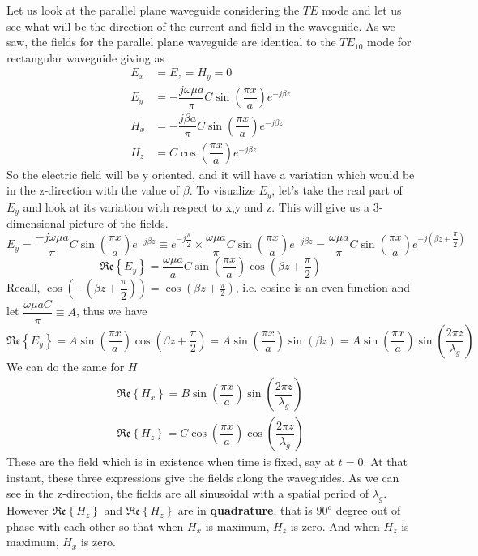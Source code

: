 Let us look at the parallel plane waveguide considering the $TE$ mode and let us see what will be the direction of the current and field in the waveguide. As we saw, the fields for the parallel plane waveguide are identical to the $TE_{10}$ mode for rectangular waveguide giving as
\begin{align*}
E_x &= E_z = H_y = 0\\
E_y &= -\dfrac{j\omega \mu a}{\pi}C\sin(\dfrac{\pi x}{a})e^{-j\beta z}\\
H_x &= -\dfrac{j\beta a}{\pi}C\sin(\dfrac{\pi x}{a})e^{-j\beta z}\\
H_z &= C\cos(\dfrac{\pi x}{a})e^{-j\beta z}
\end{align*}
So the electric field will be y oriented, and it will have a variation which would be in the z-direction with the value of ${\beta}$. To visualize ${E_y}$, let's take the real part of ${E_y}$ and look at its variation with respect to x,y and z. This will give us a 3-dimensional picture of the fields.
\begin{dmath*}
E_y = \dfrac{-j\omega \mu a}{\pi}C\sin(\dfrac{\pi x}{a})e^{
-j\beta z}\equiv e^{-j\dfrac{\pi}{2}}\times\dfrac{\omega \mu a}{\pi}C\sin(\dfrac{\pi x}{a})e^{-j\beta z}  = \dfrac{\omega \mu a}{\pi}C\sin(\dfrac{\pi x}{a})e^{-j\left(\beta z + \dfrac{\pi}{2}\right)
}
\end{dmath*}
\begin{dmath*}
\mathfrak{Re}\left\{E_y\right\} = \dfrac{\omega \mu a}{a}C\sin(\dfrac{\pi x}{a})\cos(\beta z + \dfrac{\pi}{2})
\end{dmath*}
Recall, $\cos(-\left(\beta z + \dfrac{\pi}{2}\right))=\cos(\beta z + \frac{\pi}{2})$, i.e. cosine is an even function and let ${\dfrac{\omega \mu aC}{\pi}\equiv A}$, thus we have 
\begin{dmath*}
\mathfrak{Re}\left\{E_y\right\} = A\sin(\dfrac{\pi x}{a})\cos(\beta z +\dfrac{\pi}{2}) = A\sin(\dfrac{\pi x}{a})\sin(\beta z) = A\sin(\dfrac{\pi x}{a})\sin(\dfrac{2\pi z}{\lambda_g})
\end{dmath*}
We can do the same for ${H}$
\begin{align*}
\mathfrak{Re}\left\{H_x\right\} = B\sin(\dfrac{\pi x}{a})\sin(\dfrac{2\pi z}{\lambda_g})\\
\mathfrak{Re}\left\{H_z\right\}= C\cos(\dfrac{\pi x}{a})\cos(\dfrac{2\pi z}{\lambda_g})
\end{align*}
These are the field which is in existence when time is fixed, say at $t=0$. At that instant, these three expressions give the fields along the waveguides. As we can see in the z-direction, the fields are all sinusoidal with a spatial period of ${\lambda_g}$. However ${\mathfrak{Re}\left\{H_z\right\}}$ and ${\mathfrak{Re}\left\{H_z\right\}}$ are in \textbf{quadrature}, that is ${90^{o}}$ degree out of phase with each other so that when ${H_x}$ is maximum, ${H_z}$ is zero. And when ${H_z}$ is maximum, ${H_x}$ is zero. 

